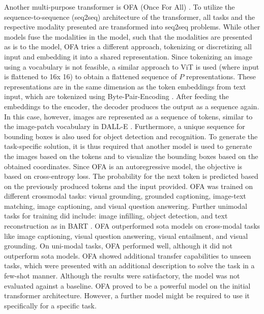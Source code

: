\documentclass[
]{krantz}
\begin{document}
Another multi-purpose transformer is OFA (Once For All) \citep{Wang2022}. To utilize the sequence-to-sequence (seq2seq) architecture of the transformer, all tasks and the respective modality presented are transformed into seq2seq problems.
While other models fuse the modalities in the model, such that the modalities are presented as is to the model, OFA tries a different approach, tokenizing or discretizing all input and embedding it into a shared representation. Since tokenizing an image using a vocabulary is not feasible, a similar approach to ViT \citep{dosovitskiy2020image} is used (where input is flattened to 16x 16) to obtain a flattened sequence of \(P\) representations. These representations are in the same dimension as the token embeddings from text input, which are tokenized using Byte-Pair-Encoding \citep{sennrich-etal-2016-neural}. After feeding the embeddings to the encoder, the decoder produces the output as a sequence again. In this case, however, images are represented as a sequence of tokens, similar to the image-patch vocabulary in DALL-E \citep{pmlr-v139-ramesh21a}. Furthermore, a unique sequence for bounding boxes is also used for object detection and recognition. To generate the task-specific solution, it is thus required that another model is used to generate the images based on the tokens and to visualize the bounding boxes based on the obtained coordinates.
Since OFA is an autoregressive model, the objective is based on cross-entropy loss. The probability for the next token is predicted based on the previously produced tokens and the input provided.
OFA was trained on different crossmodal tasks: visual grounding, grounded captioning, image-text matching, image captioning, and visual question answering. Further unimodal tasks for training did include: image infilling, object detection, and text reconstruction as in BART \citep{lewis-etal-2020-bart}.
OFA outperformed sota models on cross-modal tasks like image captioning, visual question answering, visual entailment, and visual grounding. On uni-modal tasks, OFA performed well, although it did not outperform sota models. OFA showed additional transfer capabilities to unseen tasks, which were presented with an additional description to solve the task in a few-shot manner. Although the results were satisfactory, the model was not evaluated against a baseline.
OFA proved to be a powerful model on the initial transformer architecture. However, a further model might be required to use it specifically for a specific task.
\end{document}
